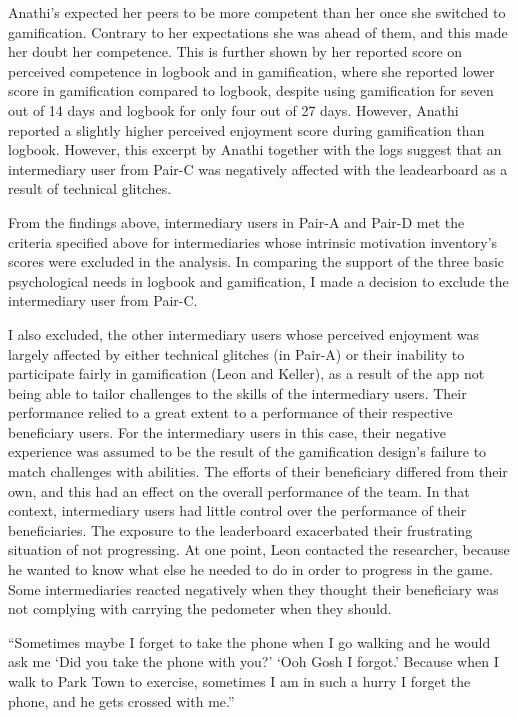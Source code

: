 Anathi's expected her peers to be more competent than her once she switched to gamification. Contrary to her expectations she was ahead of them, and this made her doubt her competence. This is further shown by her reported score on perceived competence in logbook and in gamification, where she reported lower score in gamification compared to logbook, despite using gamification for seven out of 14 days and logbook for only four out of 27 days. However, Anathi reported a slightly higher perceived enjoyment score  during gamification than logbook. However, this excerpt by Anathi together with the logs suggest that an intermediary user from Pair-C was negatively affected with the leadearboard as a result of technical glitches. 

From the findings above, intermediary users in Pair-A and Pair-D met the criteria specified above for intermediaries whose intrinsic motivation inventory's scores were excluded in the analysis.
In comparing the support of the three basic psychological needs in logbook and gamification, I made a decision to exclude the intermediary user from Pair-C.    

I also excluded, the other intermediary users whose perceived enjoyment was largely affected by either technical glitches (in Pair-A) or their inability to participate fairly in gamification (Leon and Keller), as a result of the app not being able to tailor challenges to the skills of the intermediary users. Their performance relied to a great extent to a performance of their respective beneficiary users. For the intermediary users in this case, their negative experience was assumed to be the result of the gamification design's failure to match challenges with abilities. The efforts of their beneficiary differed from their own, and this had an effect on the overall performance of the team. In that context, intermediary users had little control over the performance of their beneficiaries. The exposure to the leaderboard exacerbated their frustrating situation of not progressing. At one point, Leon contacted the researcher, because he wanted to know what else he needed to do in order to progress in the game. Some intermediaries reacted negatively when they thought their beneficiary was not complying with carrying the pedometer when they should. 

 {``Sometimes maybe I forget to take the phone when I go walking and he would ask me `Did you take the phone with you?' `Ooh Gosh I forgot.'  Because when I walk to Park Town to exercise, sometimes  I am in such a hurry I forget the phone, and he gets crossed with me.''} 

